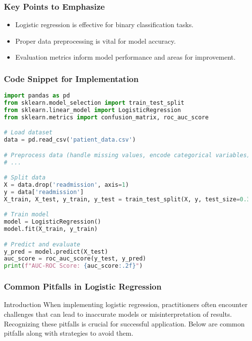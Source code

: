 \documentclass[aspectratio=169]{beamer}
\begin{document}
\begin{frame}[fragile]
    \frametitle{Key Points to Emphasize}
    \begin{itemize}
        \item Logistic regression is effective for binary classification tasks.
        \item Proper data preprocessing is vital for model accuracy.
        \item Evaluation metrics inform model performance and areas for improvement.
    \end{itemize}
\end{frame}

\begin{frame}[fragile]
    \frametitle{Code Snippet for Implementation}
    \begin{lstlisting}[language=Python]
import pandas as pd
from sklearn.model_selection import train_test_split
from sklearn.linear_model import LogisticRegression
from sklearn.metrics import confusion_matrix, roc_auc_score

# Load dataset
data = pd.read_csv('patient_data.csv')

# Preprocess data (handle missing values, encode categorical variables)
# ...

# Split data
X = data.drop('readmission', axis=1)
y = data['readmission']
X_train, X_test, y_train, y_test = train_test_split(X, y, test_size=0.3, random_state=42)

# Train model
model = LogisticRegression()
model.fit(X_train, y_train)

# Predict and evaluate
y_pred = model.predict(X_test)
auc_score = roc_auc_score(y_test, y_pred)
print(f"AUC-ROC Score: {auc_score:.2f}")
    \end{lstlisting}
\end{frame}

\begin{frame}[fragile]
    \frametitle{Common Pitfalls in Logistic Regression}
    \begin{block}{Introduction}
        When implementing logistic regression, practitioners often encounter challenges that can lead to inaccurate models or misinterpretation of results. Recognizing these pitfalls is crucial for successful application. Below are common pitfalls along with strategies to avoid them.
    \end{block}
\end{frame}
\end{document}
